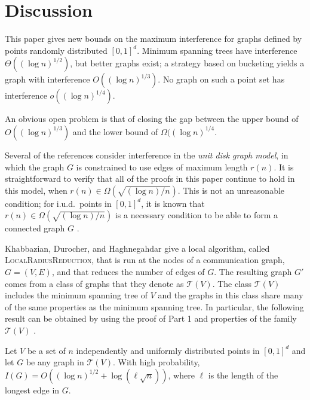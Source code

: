 \documentclass{patmorin}
\newcommand{\mst}{\mathit{MST}}
\begin{document}
\section{Discussion}

This paper gives new bounds on the maximum interference for graphs defined
by points randomly distributed $[0,1]^d$. Minimum spanning trees have
interference $\Theta((\log n)^{1/2})$, but better graphs exist; a strategy
based on bucketing yields a graph with interference $O((\log n)^{1/3})$.
No graph on such a point set has interference $o((\log n)^{1/4})$.

An obvious open problem is that of closing the gap between the upper bound
of $O((\log n)^{1/3})$ and the lower bound of $\Omega((\log n)^{1/4}$.


Several of the references consider interference in the \emph{unit
disk graph model}, in which the graph $G$ is constrained to use
edges of maximum length $r(n)$.  It is straightforward to verify
that all of the proofs in this paper continue to hold in this model,
when $r(n)\in\Omega(\sqrt{(\log n)/n})$.  This is not an unreasonable
condition; for i.u.d.\ points in $[0,1]^d$, it is known that
$r(n)\in\Omega(\sqrt{(\log n)/n})$ is a necessary condition to be able to
form a connected graph $G$ \cite{p97}.

Khabbazian, Durocher, and Haghnegahdar \cite{kdhk15} give a local
algorithm, called \textsc{LocalRadiusReduction}, that is run at the
nodes of a communication graph, $G=(V,E)$, and that reduces the number
of edges of $G$.  The resulting graph $G'$ comes from a class of graphs
that they denote as $\mathcal{T}(V)$.  The class $\mathcal{T}(V)$ includes
the minimum spanning tree of $V$ and the graphs in this class share many
of the same properties as the minimum spanning tree.  In particular, the
following result can be obtained by using the proof of  Part
1 and properties of the family $\mathcal{T}(V)$ \cite[Theorem~3]{kdhk15}.

\setcounter{thm}{2}
\begin{thm}
  Let $V$ be a set of $n$ independently and uniformly distributed
  points in $[0,1]^d$ and let $G$ be any graph in $\mathcal{T}(V)$.
  With high probability, $I(G)=O((\log n)^{1/2}+\log (\ell\sqrt{n}))$,
  where $\ell$ is the length of the longest edge in $G$.
\end{thm}
\end{document}
